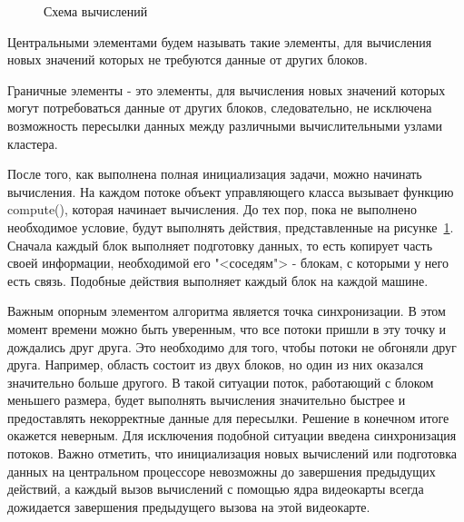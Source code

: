 \documentclass[a4paper, 14pt]{extarticle}
\theoremstyle{definition}
\begin{document}
\begin{figure}[h]
	\caption{Схема вычислений}
	\label{ris:scheme}
\end{figure}

\par Центральными элементами будем называть такие элементы, для вычисления новых значений которых не требуются данные от других блоков.

\par Граничные элементы - это элементы, для вычисления новых значений которых могут потребоваться данные от других блоков, следовательно, не исключена возможность пересылки данных между различными вычислительными узлами кластера.

\par После того, как выполнена полная инициализация задачи, можно начинать вычисления. На каждом потоке объект управляющего класса вызывает функцию compute(), которая начинает вычисления. До тех пор, пока не выполнено необходимое условие, будут выполнять действия, представленные на рисунке~\ref{ris:scheme}. Сначала каждый блок выполняет подготовку данных, то есть копирует часть своей информации, необходимой его  "<соседям"> - блокам, с которыми у него есть связь. Подобные действия выполняет каждый блок на каждой машине.

\par Важным опорным элементом алгоритма является точка синхронизации. В этом момент времени можно быть уверенным, что все потоки пришли в эту точку и дождались друг друга. Это необходимо для того, чтобы потоки не обгоняли друг друга. Например, область состоит из двух блоков, но один из них оказался значительно больше другого. В такой ситуации поток, работающий с блоком меньшего размера, будет выполнять вычисления значительно быстрее и предоставлять некорректные данные для пересылки. Решение в конечном итоге окажется неверным. Для исключения подобной ситуации введена синхронизация потоков. Важно отметить, что инициализация новых вычислений или подготовка данных на центральном процессоре невозможны до завершения предыдущих действий, а каждый вызов вычислений с помощью ядра видеокарты всегда дожидается завершения предыдущего вызова на этой видеокарте.
\end{document}
